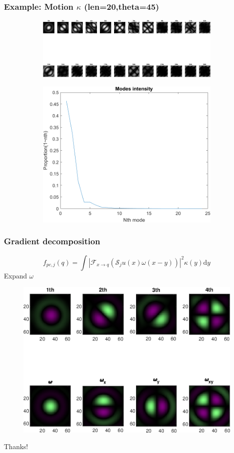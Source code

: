 \documentclass[UTF8]{beamer}
\begin{document}
\begin{frame} \frametitle{Example: Motion $\kappa$ (len=20,theta=45)}
\begin{figure}[H]
\centering
\begin{subfigure}{1\textwidth}
    \centering
    \includegraphics[width=0.9\linewidth]{../figures/ex_motion.png}  
    \label{fig:modes_u}
 \end{subfigure}
 \begin{subfigure}{1\textwidth}
    \centering
    \includegraphics[width=.5\linewidth]{../figures/ex_motion_s.png}  
    \label{fig:modes_u_phaze}
 \end{subfigure}
 \end{figure}
\end{frame}

\begin{frame} \frametitle{Gradient decomposition}
\begin{equation}
f_{p c, j}(q) = \int\left|\mathcal{F}_{x \rightarrow q}\left(\mathcal{S}_{j} u(x) \omega(x-y)\right)\right|^{2} \kappa(y) \mathrm{d} y
\end{equation}
Expand $\omega$
\begin{figure}[H]
\centering

\includegraphics[width=0.8\linewidth]{../figures/gradients.eps}  
 \end{figure}
\end{frame}

%
\begin{frame} 

\centerline{\huge Thanks!}
\end{frame}
\end{document}
